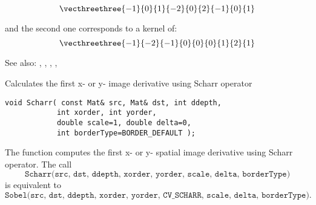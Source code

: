 \[ \vecthreethree
{-1}{0}{1}
{-2}{0}{2}
{-1}{0}{1}
\]

and the second one corresponds to a kernel of:
\[ \vecthreethree
{-1}{-2}{-1}
{0}{0}{0}
{1}{2}{1}
\]

See also: , , , , 

Calculates the first x- or y- image derivative using Scharr operator

\begin{lstlisting}
void Scharr( const Mat& src, Mat& dst, int ddepth,
            int xorder, int yorder,
            double scale=1, double delta=0,
            int borderType=BORDER_DEFAULT );
\end{lstlisting}
\begin{description}
\end{description}

The function computes the first x- or y- spatial image derivative using Scharr operator. The call
\[\texttt{Scharr(src, dst, ddepth, xorder, yorder, scale, delta, borderType)}\]
is equivalent to
\[\texttt{Sobel(src, dst, ddepth, xorder, yorder, CV\_SCHARR, scale, delta, borderType)}.\]

\fi
